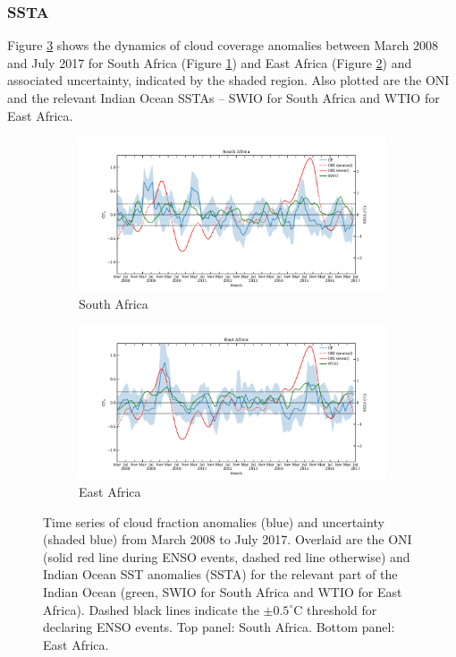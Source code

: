 \subsubsection{SSTA}
Figure \ref{fig:cf_temporal} shows the dynamics of cloud coverage
anomalies between March 2008 and July 2017 for South Africa (Figure
\ref{fig:cf_t_south}) and East Africa (Figure \ref{fig:cf_t_east}) and
associated uncertainty, indicated by the shaded region. Also plotted
are the ONI and the relevant Indian Ocean SSTAs -- SWIO
for South Africa and WTIO for East Africa.
\begin{figure}
  \centering
  \begin{subfigure}{\textwidth}
    \centering
    \includegraphics[width=\textwidth]{figures/cf_oni_io_capetown_5window_median}
    \caption{South Africa}
    \label{fig:cf_t_south}
  \end{subfigure}
  \begin{subfigure}{\textwidth}
    \centering
    \includegraphics[width=\textwidth]{figures/cf_oni_io_eastafrica_5window_median}
    \caption{East Africa}
    \label{fig:cf_t_east}
    \end{subfigure}
  \caption{Time series of cloud fraction anomalies (blue) and
    uncertainty (shaded blue) from March 2008 to July 2017. Overlaid
    are the ONI (solid red line during ENSO events, dashed red line
    otherwise) and Indian Ocean SST anomalies (SSTA) for the relevant
    part of the Indian Ocean (green, SWIO for South Africa and WTIO
    for East Africa). Dashed black lines indicate the $\pm0.5^{\circ}$C
    threshold for declaring ENSO events. Top panel: South
    Africa. Bottom panel: East Africa.}
  \label{fig:cf_temporal}
\end{figure}

